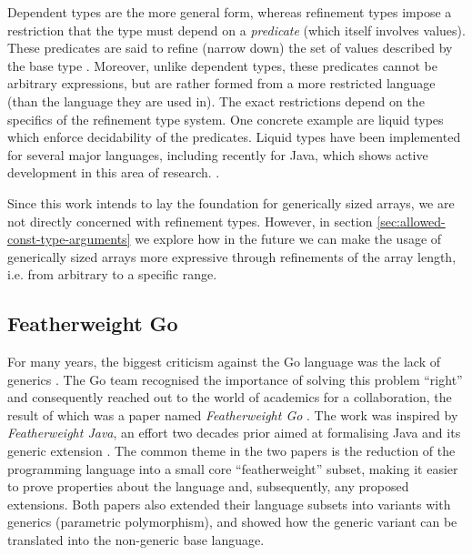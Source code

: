 


Dependent types are the more general form, whereas refinement types impose a
restriction that the type must depend on a \emph{predicate} (which itself
involves values). These predicates are said to refine (narrow down) the set of
values described by the base type \autocite{refinement}. Moreover, unlike
dependent types, these predicates cannot be arbitrary expressions, but are
rather formed from a more restricted language (than the language they are used
in). The exact restrictions depend on the specifics of the refinement type
system. One concrete example are liquid types which enforce decidability of the
predicates. Liquid types have been implemented for several major languages,
including recently for Java, which shows active development in this area of
research. \autocites{liquidTypesBlog}{liquidJava}.

Since this work intends to lay the foundation for generically sized arrays, we
are not directly concerned with refinement types. However, in section
\ref{sec:allowed-const-type-arguments} we explore how in the
future we can make the usage of generically sized arrays more expressive through
refinements of the array length, i.e. from arbitrary to a specific range.

\subsection{Featherweight Go}

For many years, the biggest criticism against the Go language was the lack of
generics \autocites{survey2021}{survey2020}{survey2019}. The Go team recognised
the importance of solving this problem ``right'' and consequently reached out to
the world of academics for a collaboration, the result of which was a paper
named \emph{Featherweight Go} \autocite{fg}. The work was inspired by
\emph{Featherweight Java}, an effort two decades prior aimed at formalising Java
and its generic extension \autocite{fj}. The common theme in the two papers is
the reduction of the programming language into a small core ``featherweight''
subset, making it easier to prove properties about the language and,
subsequently, any proposed extensions.
Both papers also extended their language subsets into variants with generics
(parametric polymorphism), and showed how the generic variant can be translated
into the non-generic base language.

